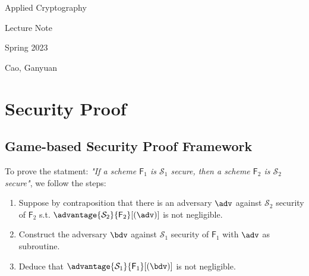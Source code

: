 \documentclass[11pt,a4paper]{article}
\begin{document}
\newpage
\begin{center}
\sc
\huge{Applied Cryptography} 

\vspace{0.5cm}
\Large{Lecture Note}

\vspace{0.5cm}
\large{Spring 2023}

\vspace{0.5cm}
\large{Cao, Ganyuan}
\vspace{1cm}
\end{center}

\tableofcontents



\newpage
\section{Security Proof}
\subsection{Game-based Security Proof Framework}
To prove the statment: \textit{"If a scheme $\textsf{F}_1$ is $\mathcal{S}_1$ secure, then a scheme $\textsf{F}_2$ is $\mathcal{S}_2$ secure"}, we follow the steps:
\begin{enumerate}
	\item Suppose by contraposition that there is an adversary $\adv$ against $\mathcal{S}_2$ security of $\textsf{F}_2$ s.t. $\advantage{\mathcal{S}_2}{\textsf{F}_2}[(\adv)]$ is not negligible. 
	\item Construct the adversary $\bdv$ against $\mathcal{S}_1$ security of $\textsf{F}_1$ with $\adv$ as subroutine. 
	\item Deduce that $\advantage{\mathcal{S}_1}{\textsf{F}_1}[(\bdv)]$ is not negligible. 
\end{enumerate}
\end{document}
